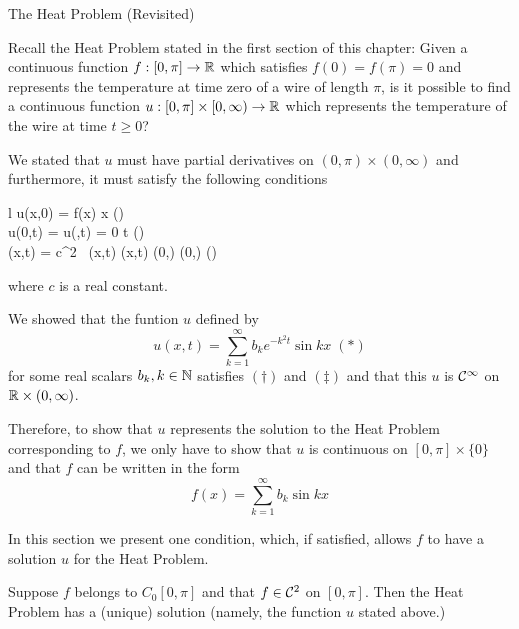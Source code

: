 \begin{section}{The Heat Problem (Revisited)}

Recall the Heat Problem stated in the first
section of this chapter: Given a continuous 
function $f:[0,\pi] \to \real$
which satisfies $f(0) = f(\pi) = 0$ and represents
the temperature at time zero of a wire of length
$\pi$, is it possible to find a
continuous function $u:[0,\pi] \times [0,\infty)
\to \real$ which represents the temperature of the
wire at time $t \geq 0$?

We stated that $u$ must have partial derivatives
on $(0,\pi) \times (0,\infty)$ and furthermore, it must
satisfy the following conditions

	\begin{IEEEeqnarray*}{l}
		u(x,0) = f(x)  x \in [0,\pi] \; (\ast) \\
		u(0,t) = u(\pi,t) = 0  t  \; (\dagger) \\
		(x,t) = c^2 \,
			(x,t)
			 (x,t) \in 
			(0,\pi) \times (0,\infty) \; (\ddagger)
	\end{IEEEeqnarray*}
where $c$ is a real constant.

We showed that the funtion $u$ defined by
	\begin{displaymath}
		u(x,t) = \sum_{k=1}^\infty b_k e^{-k^2t}\sin kx
			\; (\ast)
	\end{displaymath}
for some real scalars $b_k, k \in \natrl$ satisfies
$(\dagger)$ and $(\ddagger)$ and that
this $u$ is $\ctsdiff$ on $\real \times (0,\infty)$.

Therefore, to show that $u$ represents the solution
to the Heat Problem corresponding to $f$, we only
have to show that $u$ is continuous on $[0,\pi] \times
\{0\}$ and that $f$ can be written in the form
	\begin{displaymath}
		f(x) = \sum_{k=1}^\infty b_k\sin kx
	\end{displaymath}

In this section we present one condition, which,
if satisfied, allows $f$ to have a solution $u$
for the Heat Problem.

\begin{thrm}
	Suppose $f$ belongs to $C_0[0,\pi]$ and that
	$f \in \ctsdiff[2]$ on $[0,\pi]$. Then the
	Heat Problem has a (unique) solution (namely,
	the function $u$ stated above.)
\end{thrm}


\end{section}
